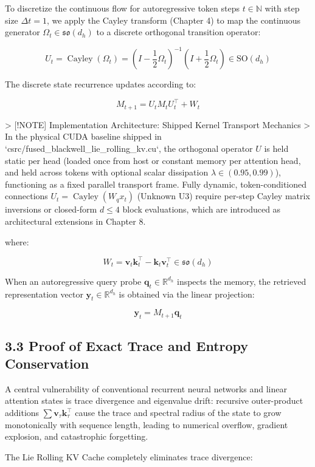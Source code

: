 \documentclass[11pt,twoside,openright]{amsbook}
\begin{document}
{{{{{{{To discretize the continuous flow for autoregressive token steps $t \in \mathbb{N}$ with step size $\Delta t = 1$, we apply the Cayley transform (Chapter 4) to map the continuous generator $\Omega_t \in \mathfrak{so}(d_h)$ to a discrete orthogonal transition operator:

$$U_t = \operatorname{Cayley}(\Omega_t) = \left( I - \frac{1}{2}\Omega_t \right)^{-1} \left( I + \frac{1}{2}\Omega_t \right) \in \mathrm{SO}(d_h)$$

The discrete state recurrence updates according to:

$$\boxed{M_{t+1} = U_t M_t U_t^\top + W_t}$$


> [!NOTE] Implementation Architecture: Shipped Kernel Transport Mechanics
> In the physical CUDA baseline shipped in `csrc/fused_blackwell_lie_rolling_kv.cu`, the orthogonal operator $U$ is held static per head (loaded once from host or constant memory per attention head, and held across tokens with optional scalar dissipation $\lambda \in (0.95, 0.99)$), functioning as a fixed parallel transport frame. Fully dynamic, token-conditioned connections $U_t = \operatorname{Cayley}(W_q x_t)$ (Unknown U3) require per-step Cayley matrix inversions or closed-form $d \le 4$ block evaluations, which are introduced as architectural extensions in Chapter 8.

where:

$$W_t = \mathbf{v}_t \mathbf{k}_t^\top - \mathbf{k}_t \mathbf{v}_t^\top \in \mathfrak{so}(d_h)$$

When an autoregressive query probe $\mathbf{q}_t \in \mathbb{R}^{d_h}$ inspects the memory, the retrieved representation vector $\mathbf{y}_t \in \mathbb{R}^{d_h}$ is obtained via the linear projection:

$$\boxed{\mathbf{y}_t = M_{t+1} \mathbf{q}_t}$$

\subsection{3.3 Proof of Exact Trace and Entropy Conservation}

A central vulnerability of conventional recurrent neural networks and linear attention states is trace divergence and eigenvalue drift: recursive outer-product additions $\sum \mathbf{v}_\tau \mathbf{k}_\tau^\top$ cause the trace and spectral radius of the state to grow monotonically with sequence length, leading to numerical overflow, gradient explosion, and catastrophic forgetting.

The Lie Rolling KV Cache completely eliminates trace divergence:

}}}}}}}
\end{document}

